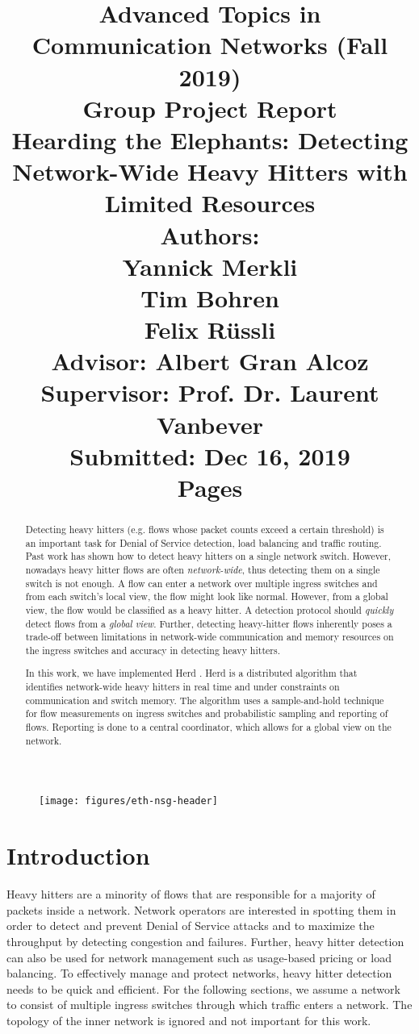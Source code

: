 \documentclass[11pt,oneside,a4paper]{article}
\title{
    \vspace*{0.0mm}
    \LARGE\bf\sf Advanced Topics in \\Communication Networks (Fall 2019)
    \vspace*{10.0mm} \\
    \Large\bf\sf Group Project Report \vspace*{30.0mm}\\
    \Huge\bf\sf Hearding the Elephants: Detecting Network-Wide Heavy Hitters with Limited Resources
    \vspace*{30.0mm} \\
    \normalsize
    \sf Authors:\\[5pt]
    \sf Yannick Merkli\\ [5pt]
    \sf Tim Bohren\\ [5pt]
    \sf Felix Rüssli \vspace*{5mm}\\
    \sf  Advisor: Albert Gran Alcoz \vspace*{5mm}\\
    \sf  Supervisor:  Prof. Dr. Laurent Vanbever \vspace*{20.0mm}\\
    \sf Submitted: Dec 16, 2019\\ [5pt]
    \sf \pageref{lastpage} Pages
}
\date{}
\begin{document}
\begin{figure}
    \texttt{[image: figures/eth-nsg-header]}
\end{figure}

\maketitle
\thispagestyle{empty}
\raggedbottom
\clearpage


\begin{abstract}
Detecting heavy hitters (e.g. flows whose packet counts exceed a certain threshold) is an important task for Denial of Service detection, load balancing and traffic routing. Past work has shown how to detect heavy hitters on a single network switch. However, nowadays heavy hitter flows are often \textit{network-wide}, thus detecting them on a single switch is not enough. A flow can enter a network over multiple ingress switches and from each switch's local view, the flow might look like normal. However, from a global view, the flow would be classified as a heavy hitter. A detection protocol should \textit{quickly} detect flows from a \textit{global view}. Further, detecting heavy-hitter flows inherently poses a trade-off between limitations in network-wide communication and memory resources on the ingress switches and accuracy in detecting heavy hitters. 

In this work, we have implemented Herd \cite{anon2019herd}. Herd is a distributed algorithm that identifies network-wide heavy hitters in real time and under constraints on communication and switch memory. The algorithm uses a sample-and-hold technique for flow measurements on ingress switches and probabilistic sampling and reporting of flows. Reporting is done to a central coordinator, which allows for a global view on the network.

\end{abstract}

\clearpage
\setcounter{tocdepth}{2}
\tableofcontents
\clearpage
{}

\section{Introduction}

Heavy hitters are a minority of flows that are responsible for a majority of packets inside a network. Network operators are interested in spotting them in order to detect and prevent Denial of Service attacks and to maximize the throughput by detecting congestion and failures. Further, heavy hitter detection can also be used for network management such as usage-based pricing or load balancing. To effectively manage and protect networks, heavy hitter detection needs to be quick and efficient. For the following sections, we assume a network to consist of multiple ingress switches through which traffic enters a network. The topology of the inner network is ignored and not important for this work.
\end{document}
